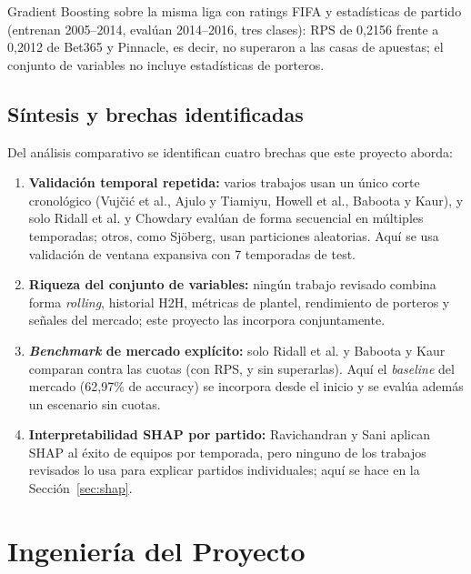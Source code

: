 \documentclass{ieeeaccess}
\begin{document}
Gradient Boosting sobre la misma liga con ratings FIFA y estadísticas de partido (entrenan 2005--2014, evalúan 2014--2016, tres clases): RPS de 0,2156 frente a 0,2012 de Bet365 y Pinnacle, es decir, no superaron a las casas de apuestas; el conjunto de variables no incluye estadísticas de porteros.

\subsection{Síntesis y brechas identificadas}
Del análisis comparativo se identifican cuatro brechas que este proyecto aborda:
\begin{enumerate}
\item \textbf{Validación temporal repetida:} varios trabajos usan un único corte cronológico (Vujčić et al., Ajulo y Tiamiyu, Howell et al., Baboota y Kaur), y solo Ridall et al. y Chowdary evalúan de forma secuencial en múltiples temporadas; otros, como Sjöberg, usan particiones aleatorias. Aquí se usa validación de ventana expansiva con 7 temporadas de test.
\item \textbf{Riqueza del conjunto de variables:} ningún trabajo revisado combina forma \textit{rolling}, historial H2H, métricas de plantel, rendimiento de porteros y señales del mercado; este proyecto las incorpora conjuntamente.
\item \textbf{\textit{Benchmark} de mercado explícito:} solo Ridall et al. y Baboota y Kaur comparan contra las cuotas (con RPS, y sin superarlas). Aquí el \textit{baseline} del mercado (62,97\% de accuracy) se incorpora desde el inicio y se evalúa además un escenario sin cuotas.
\item \textbf{Interpretabilidad SHAP por partido:} Ravichandran y Sani aplican SHAP al éxito de equipos por temporada, pero ninguno de los trabajos revisados lo usa para explicar partidos individuales; aquí se hace en la Sección~\ref{sec:shap}.
\end{enumerate}

\section{Ingeniería del Proyecto}
\label{sec:ingenieria}
\end{document}
